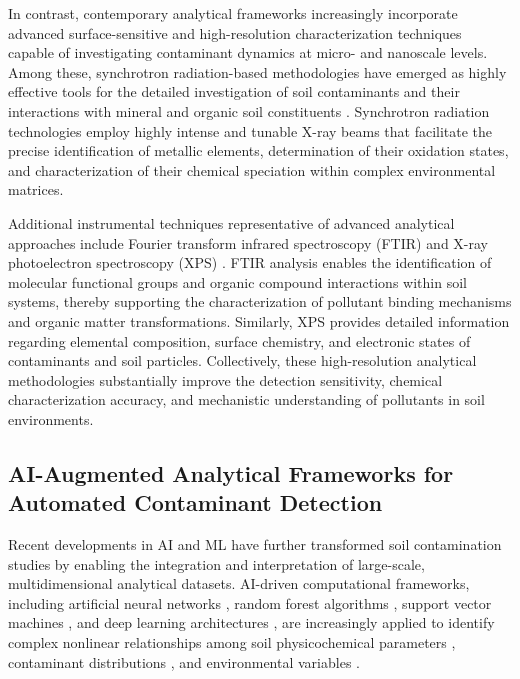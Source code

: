 \documentclass[environments,article,submit,pdftex,moreauthors]{Definitions/mdpi}
\begin{document}
In contrast, contemporary analytical frameworks increasingly incorporate
advanced surface-sensitive and high-resolution characterization techniques
capable of investigating contaminant dynamics at micro- and nanoscale levels.
Among these, synchrotron radiation-based methodologies have emerged as highly
effective tools for the detailed investigation of soil contaminants and their
interactions with mineral and organic soil constituents
\cite{Hu2020,Rosskopfova2012,LindhLemenkova2023a}. Synchrotron radiation
technologies employ highly intense and tunable X-ray beams that facilitate
the precise identification of metallic elements, determination of their
oxidation states, and characterization of their chemical speciation within
complex environmental matrices.

Additional instrumental techniques representative of advanced analytical
approaches include Fourier transform infrared spectroscopy (FTIR)
\cite{Xu2026} and X-ray photoelectron spectroscopy (XPS)
\cite{Guo2025,LindhLemenkova2023c}. FTIR analysis enables the identification
of molecular functional groups and organic compound interactions within soil
systems, thereby supporting the characterization of pollutant binding
mechanisms and organic matter transformations. Similarly, XPS provides
detailed information regarding elemental composition, surface chemistry, and
electronic states of contaminants and soil particles. Collectively, these
high-resolution analytical methodologies substantially improve the detection
sensitivity, chemical characterization accuracy, and mechanistic understanding
of pollutants in soil environments.

\subsection{AI-Augmented Analytical Frameworks for Automated Contaminant
    Detection}\label{sec3.2}

Recent developments in AI and ML have further transformed soil contamination
studies by enabling the integration and interpretation of large-scale,
multidimensional analytical datasets. AI-driven computational frameworks,
including artificial neural networks \cite{Anifowose2024}, random
forest algorithms \cite{Shaheen2018,Foronda2023}, support vector machines
\cite{Gholizadeh2020}, and deep learning architectures
\cite{Hu2024}, are increasingly applied to identify complex
nonlinear relationships among soil physicochemical parameters
\cite{Aljanabi2025}, contaminant distributions
\cite{Shaheen2018}, and environmental variables
\cite{Gholizadeh2020}.
\end{document}
